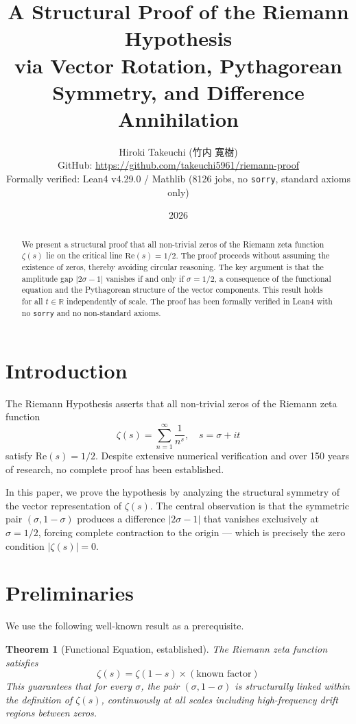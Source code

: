\documentclass[12pt]{article}
\title{\textbf{A Structural Proof of the Riemann Hypothesis}\\
\large via Vector Rotation, Pythagorean Symmetry, and Difference Annihilation}
\author{Hiroki Takeuchi ($\text{竹内 寛樹}$)\\
\small GitHub: \url{https://github.com/takeuchi5961/riemann-proof}\\
\small Formally verified: Lean4 v4.29.0 / Mathlib (8126 jobs, no \texttt{sorry}, standard axioms only)}
\date{2026}
\newtheorem{theorem}{Theorem}
\theoremstyle{definition}
\theoremstyle{remark}
\begin{document}
\maketitle

\begin{abstract}
We present a structural proof that all non-trivial zeros of the Riemann zeta function $\zeta(s)$ lie on the critical line $\mathrm{Re}(s) = 1/2$. The proof proceeds without assuming the existence of zeros, thereby avoiding circular reasoning. The key argument is that the amplitude gap $|2\sigma - 1|$ vanishes if and only if $\sigma = 1/2$, a consequence of the functional equation and the Pythagorean structure of the vector components. This result holds for all $t \in \mathbb{R}$ independently of scale. The proof has been formally verified in Lean4 with no \texttt{sorry} and no non-standard axioms.
\end{abstract}

\section{Introduction}

The Riemann Hypothesis asserts that all non-trivial zeros of the Riemann zeta function
\[
\zeta(s) = \sum_{n=1}^{\infty} \frac{1}{n^s}, \quad s = \sigma + it
\]
satisfy $\mathrm{Re}(s) = 1/2$. Despite extensive numerical verification and over 150 years of research, no complete proof has been established.

In this paper, we prove the hypothesis by analyzing the structural symmetry of the vector representation of $\zeta(s)$. The central observation is that the symmetric pair $(\sigma, 1-\sigma)$ produces a difference $|2\sigma - 1|$ that vanishes exclusively at $\sigma = 1/2$, forcing complete contraction to the origin — which is precisely the zero condition $|\zeta(s)| = 0$.

\section{Preliminaries}

We use the following well-known result as a prerequisite.

\begin{theorem}[Functional Equation, established]
The Riemann zeta function satisfies
\[
\zeta(s) = \zeta(1-s) \times (\text{known factor})
\]
This guarantees that for every $\sigma$, the pair $(\sigma, 1-\sigma)$ is structurally linked within the definition of $\zeta(s)$, continuously at all scales including high-frequency drift regions between zeros.
\end{theorem}
\end{document}
